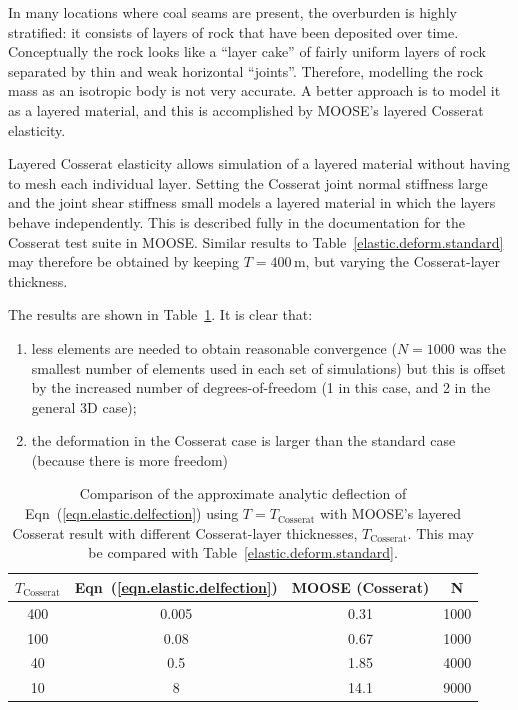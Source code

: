 \documentclass[]{scrreprt}
\begin{document}
In many locations where coal seams are present, the overburden is
highly stratified: it consists of layers of rock that have been
deposited over time.  Conceptually the rock looks like a ``layer
cake'' of fairly uniform layers of rock separated by thin and weak
horizontal ``joints''.  Therefore, modelling the rock mass as an
isotropic body is not very accurate.  A better approach is to model it
as a layered material, and this is accomplished by MOOSE's layered
Cosserat elasticity.

Layered Cosserat elasticity allows simulation of a layered material
without having to mesh each individual layer.  Setting the Cosserat
joint normal stiffness large and the joint shear stiffness small
models a layered material in which the layers behave independently.
This is described fully in the documentation for the Cosserat test
suite in MOOSE.  Similar results to
Table~\ref{elastic.deform.standard} may therefore be obtained by
keeping $T=400$\,m, but varying the Cosserat-layer thickness.

The results are shown in Table~\ref{elastic.deform.cosserat}.  It is
clear that:
\begin{enumerate}
\item less elements are needed to obtain reasonable convergence
($N=1000$ was the smallest number of elements used in each set of
  simulations) but this is offset by the increased number of
  degrees-of-freedom (1 in this case, and 2 in the general 3D case);
\item the deformation in the Cosserat case is larger than the standard
  case (because there is more freedom)
\end{enumerate}

\begin{table}[htb]
\begin{center}
\begin{tabular}{cccc}
  $T_{\mathrm{Cosserat}}$  & Eqn~(\ref{eqn.elastic.delfection}) &
  MOOSE (Cosserat) & N \\
  \hline
  400 & 0.005 & 0.31 & 1000 \\
  100 & 0.08 & 0.67 & 1000 \\
  40 & 0.5 & 1.85 & 4000 \\
  10 & 8 & 14.1 & 9000 \\
\end{tabular}
\caption{Comparison of the approximate analytic deflection of
  Eqn~(\ref{eqn.elastic.delfection}) using $T=T_{\mathrm{Cosserat}}$
  with MOOSE's layered Cosserat result with different Cosserat-layer
  thicknesses, $T_{\mathrm{Cosserat}}$.  This may be compared with
  Table~\ref{elastic.deform.standard}.}
\label{elastic.deform.cosserat}
\end{center}
\end{table}
\end{document}
